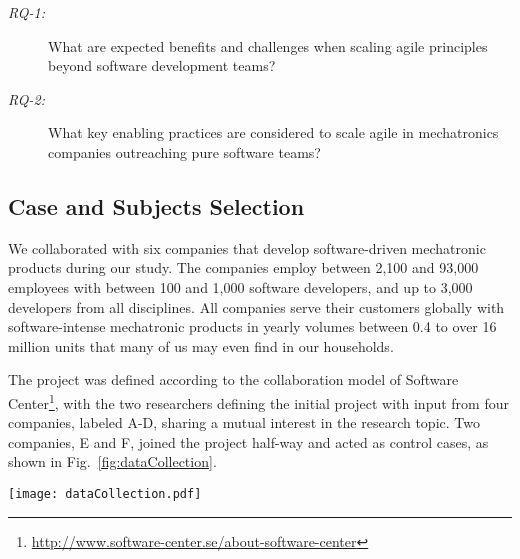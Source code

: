 \documentclass[10pt,a4paper]{IEEEtran} %
\begin{document}
\begin{description}
\item[\textit{RQ-1:}] What are expected benefits and
challenges when scaling agile principles beyond software development teams? 
\item[\textit{RQ-2:}] What key enabling practices are considered to scale agile in mechatronics companies outreaching pure software teams?
\end{description}


\subsection{Case and Subjects Selection}

We collaborated with six companies that develop software-driven mechatronic products
during our study. The companies employ between 2,100 and 93,000 employees with between 100 and 1,000 software developers, and up to 3,000 developers from all disciplines.
All companies serve their customers globally with software-intense mechatronic products in yearly volumes between 0.4 to over 16 million units that many of us may even find in our households.

The project was defined according to the collaboration model of Software
Center\footnote{\url{http://www.software-center.se/about-software-center}},
with the two researchers defining the initial project with input from four companies,
labeled A-D, sharing a mutual interest in the research topic. Two companies, E and F,
joined the project half-way and acted as control cases, as shown in
Fig.~\ref{fig:dataCollection}.


\begin{figure*}[tbp]
\centering
\texttt{[image: dataCollection.pdf]}
\caption{Overview of the data collection and analysis procedure: Out of the six participating companies during the project, we selected four companies to extract expected benefits and foreseeable challenges based on on-site workshops, separate surveys per company, and joint workshops involving all four companies. From the identified challenges, we designed a questionnaire that we used to conduct individual interviews with three senior engineers respectively, who specialized in software, hardware, and mechanics per company. We used two companies to confirm findings for agile practices particular to mechatronics.}
\label{fig:dataCollection}
\end{figure*}

\end{document}
